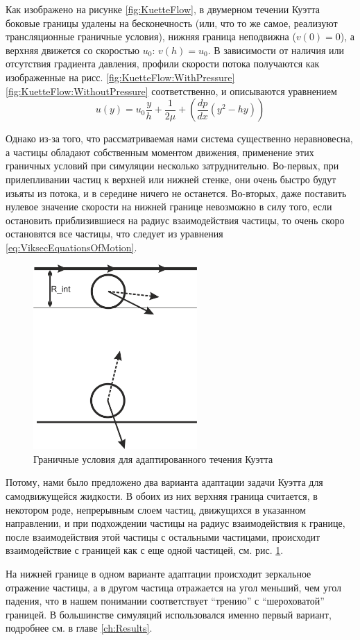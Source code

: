 	Как изображено на рисунке \ref{fig:KuetteFlow}, в двумерном течении Куэтта боковые границы удалены на бесконечность (или, что то же самое, реализуют трансляционные граничные условия), нижняя граница неподвижна ($v(0) = 0$), а верхняя движется со скоростью $u_0$: $v(h) = u_0$. В зависимости от наличия или отсутствия градиента давления, профили скорости потока получаются как изображенные на рисс. \ref{fig:KuetteFlow:WithPressure} \ref{fig:KuetteFlow:WithoutPressure} соответственно, и описываются уравнением 
        \begin{equation} \label{eq:CoetteFlow}
            u(y) = u_0 \frac{y}{h} + \frac{1}{2\mu} + (\frac{dp}{dx}(y^2 -hy))
        \end{equation}

	Однако из-за того, что рассматриваемая нами система существенно неравновесна, а частицы обладают собственным моментом движения, применение этих граничных условий при симуляции несколько затруднительно. Во-первых, при прилепливании частиц к верхней или нижней стенке, они очень быстро будут изьяты из потока, и в середине ничего не останется. Во-вторых, даже поставить нулевое значение скорости на нижней границе невозможно в силу того, если  остановить приблизившиеся на радиус взаимодействия частицы, то очень скоро остановятся все частицы, что следует из уравнения \ref{eq:ViksecEquationsOfMotion}.

	\begin{figure}
	\centering
		\includegraphics[height=200pt]{Images/BorderInterraction}
        \caption{Граничные условия для адаптированного течения Куэтта}
        \label{fig:AdaptedKuetteFlow}
	\end{figure}

	Потому, нами было предложено два варианта адаптации задачи Куэтта для самодвижущейся жидкости. В обоих из них верхняя граница считается, в некотором роде, непрерывным слоем частиц, движущихся в указанном направлении, и при подхождении частицы на радиус взаимодействия к границе, после взаимодействия этой частицы с остальными частицами, происходит взаимодействие с границей как с еще одной частицей, см. рис. \ref{fig:AdaptedKuetteFlow}.

	На нижней границе в одном варианте адаптации происходит зеркальное отражение частицы, а в другом частица отражается на угол меньший, чем угол падения, что в нашем понимании соответствует ``трению'' с ``шероховатой'' границей. В большинстве симуляций использовался именно первый вариант, подробнее см. в главе \ref{ch:Results}.


